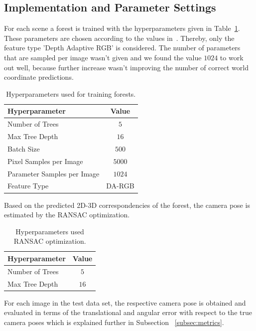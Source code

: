 \documentclass[final]{cvpr}
\begin{document}
\subsection{Implementation and Parameter Settings}
For each scene a forest is trained with the hyperparameters given in Table~\ref{tab:params-forest}. These parameters are 
chosen according to the values in~\cite{shotton2013}. Thereby, only the feature type 'Depth Adaptive RGB' is considered. The number of 
parameters that are sampled per image wasn't given and we found the value $1024$ to work out well, because further increase wasn't 
improving the number of correct world coordinate predictions.
\begin{table}[h!]
	\begin{center}
	\begin{tabular}{|l|c|}
	\hline
	Hyperparameter & Value \\
	\hline\hline
	Number of Trees & $5$ \\
	Max Tree Depth & $16$ \\
	Batch Size & $500$ \\
	Pixel Samples per Image & $5000$ \\
	Parameter Samples per Image  & $1024$ \\
	Feature Type & DA-RGB \\
	\hline
	\end{tabular}
	\end{center}
	\label{tab:params-forest}
	\caption{Hyperparameters used for training forests.}
\end{table}



Based on the predicted 2D-3D correspondencies of the forest, the camera pose is estimated by the RANSAC optimization.
\begin{table}[h!]
	\begin{center}
	\begin{tabular}{|l|c|}
	\hline
	Hyperparameter & Value \\
	\hline\hline
	Number of Trees & $5$ \\
	Max Tree Depth & $16$ \\
	\hline
	\end{tabular}
	\end{center}
	\label{tab:params-ransac}
	\caption{Hyperparameters used RANSAC optimization.}
\end{table}


For each image in the test data set, the respective camera pose is obtained and evaluated in terms of the translational 
and angular error with respect to the true camera poses which is explained further in Subsection ~\ref{subsec:metrics}.
 
\end{document}
